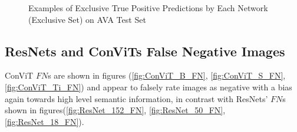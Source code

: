 \begin{figure}[ht!]
    \caption{Examples of Exclusive True Positive Predictions by Each Network (Exclusive Set) on AVA Test Set}
    \label{fig:true_positive}

\end{figure}
\subsection{ResNets and ConViTs False Negative Images}
\label{qualitative false negative}

ConViT $FN$s are shown in figures (\ref{fig:ConViT_B_FN}, \ref{fig:ConViT_S_FN},\ref{fig:ConViT_Ti_FN}) and appear to falsely rate images as negative with a bias again towards high level semantic information, in contrast with ResNets' $FN$s shown in  figures(\ref{fig:ResNet_152_FN}, \ref{fig:ResNet_50_FN}, \ref{fig:ResNet_18_FN}).


